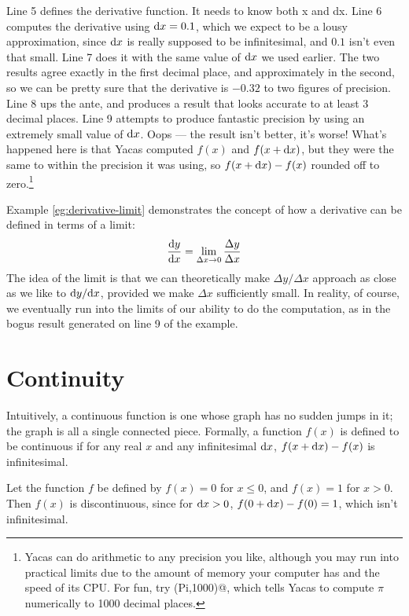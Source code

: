 Line 5 defines the derivative function. It needs to know both x and dx. Line
6 computes the derivative using $\textup{d} x=0.1$, which we expect to be a lousy approximation,
since $\textup{d} x$ is really supposed to be infinitesimal, and $0.1$ isn't even that small.
Line 7 does it with the same value of $\textup{d} x$ we used earlier. The two results agree
exactly in the first decimal place, and approximately in the second, so we can be
pretty sure that the derivative is $-0.32$ to two figures of precision. Line 8
ups the ante, and produces a result that looks accurate to at least 3 decimal places.
Line 9 attempts to produce fantastic precision by using an extremely small value of $\textup{d} x$.
Oops --- the result isn't better, it's worse! What's happened here is that Yacas
computed $f(x)$ and $f(x+\textup{d} x)$, but they were the same to within the precision it
was using, so $f(x+\textup{d} x)-f(x)$ rounded off to zero.\footnote{Yacas can do arithmetic
to any precision you like, although you may run into practical limits due to the amount
of memory your computer has and the speed of its CPU. For fun, try \verb@N(Pi,1000)@,
which tells Yacas to compute $\pi$ numerically to 1000 decimal places.}

Example \ref{eg:derivative-limit} demonstrates the concept of how a derivative can be
defined in terms of a limit:
\begin{equation*}
  \frac{\textup{d} y}{\textup{d} x} = \lim_{\Delta x\rightarrow 0} \frac{\Delta y}{\Delta x}
\end{equation*}
The idea of the limit is that we can theoretically make $\Delta y/\Delta x$ approach
as close as we like to $\textup{d} y/\textup{d} x$, provided we make $\Delta x$ sufficiently small.
In reality, of course, we eventually run into the limits of our ability to do the
computation, as in the bogus result generated on line 9 of the example.

\section{Continuity}

Intuitively, a continuous function is one whose graph
has no sudden jumps in it; the graph is all a single connected piece. Formally, a function $f(x)$ is defined to
be continuous if for any real $x$ and any infinitesimal $\textup{d} x$, $f(x+\textup{d} x)-f(x)$ is infinitesimal.\label{def-continuity}

\begin{eg}\label{eg:discontinuous}
Let the function $f$ be defined by $f(x)=0$ for $x\le 0$, and $f(x)=1$ for $x>0$. Then $f(x)$ is
discontinuous, since for $\textup{d} x>0$, $f(0+\textup{d} x)-f(0)=1$, which isn't infinitesimal.
\end{eg}

